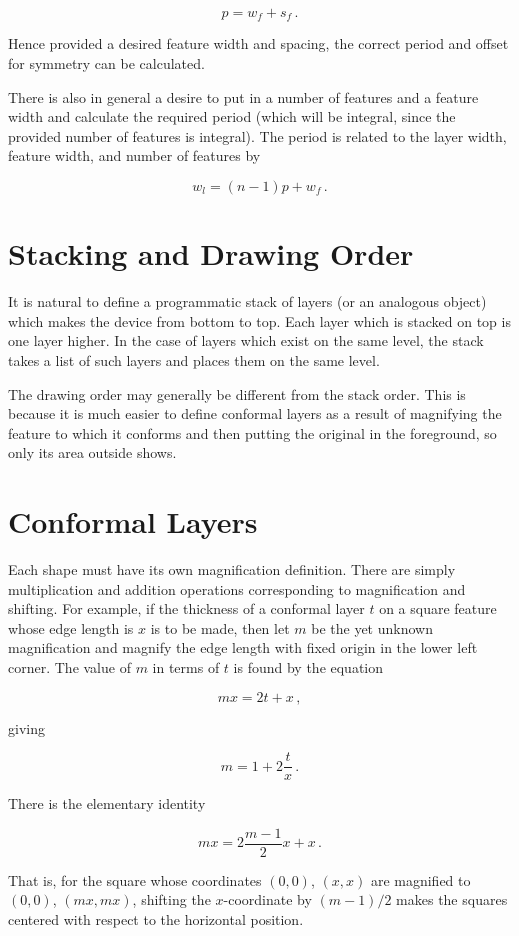 \documentclass{article}
\begin{document}
$$p = w_f + s_f \,.$$

Hence provided a desired feature width and spacing, the correct period and offset for symmetry can be calculated.

There is also in general a desire to put in a number of features and a feature width and calculate the required period (which will be integral, since the provided number of features is integral). The period is related to the layer width, feature width, and number of features by

$$ w_l = (n-1)p + w_f\,. $$


\section{Stacking and Drawing Order}
It is natural to define a programmatic stack of layers (or an analogous object) which makes the device from bottom to top. Each layer which is stacked on top is one layer higher. In the case of layers which exist on the same level, the stack takes a list of such layers and places them on the same level.

The drawing order may generally be different from the stack order. This is because it is much easier to define conformal layers as a result of magnifying the feature to which it conforms and then putting the original in the foreground, so only its area outside shows.

\section{Conformal Layers}
Each shape must have its own magnification definition. There are simply multiplication and addition operations corresponding to magnification and shifting. For example, if the thickness of a conformal layer $t$ on a square feature whose edge length is $x$ is to be made, then let $m$ be the yet unknown magnification and magnify the edge length with fixed origin in the lower left corner. The value of $m$ in terms of $t$ is found by the equation

$$ m x = 2t + x\,, $$

giving

$$ m = 1 + 2 \frac tx \,.$$

There is the elementary identity

$$mx = 2 \frac{m-1}{2} x + x \,. $$

That is, for the square whose coordinates $(0,0)$, $(x,x)$ are magnified to $(0,0)$, $(mx,mx)$, shifting the $x$-coordinate by $(m-1)/2$ makes the squares centered with respect to the horizontal position.
\end{document}
